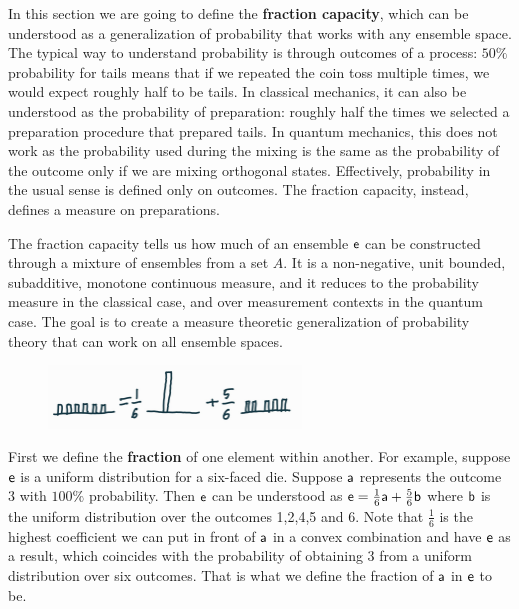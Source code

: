 In this section we are going to define the \textbf{fraction capacity}, which can be understood as a generalization of probability that works with any ensemble space. The typical way to understand probability is through outcomes of a process: $50\%$ probability for tails means that if we repeated the coin toss multiple times, we would expect roughly half to be tails. In classical mechanics, it can also be understood as the probability of preparation: roughly half the times we selected a preparation procedure that prepared tails. In quantum mechanics, this does not work as the probability used during the mixing is the same as the probability of the outcome only if we are mixing orthogonal states. Effectively, probability in the usual sense is defined only on outcomes. The fraction capacity, instead, defines a measure on preparations.

The fraction capacity tells us how much of an ensemble $\ens$ can be constructed through a mixture of ensembles from a set $A$. It is a non-negative, unit bounded, subadditive, monotone continuous measure, and it reduces to the probability measure in the classical case, and over measurement contexts in the quantum case. The goal is to create a measure theoretic generalization of probability theory that can work on all ensemble spaces.

\begin{figure}[h]
	\centering
	\includegraphics[width=0.6\textwidth]{tempimages/Fraction.jpg}
\end{figure}

First we define the \textbf{fraction} of one element within another. For example, suppose $\ens$ is a uniform distribution for a six-faced die. Suppose $\ens[a]$ represents the outcome 3 with $100\%$ probability. Then $\ens$ can be understood as $\ens = \frac{1}{6} \ens[a] + \frac{5}{6} \ens[b]$ where $\ens[b]$ is the uniform distribution over the outcomes 1,2,4,5 and 6. Note that $\frac{1}{6}$ is the highest coefficient we can put in front of $\ens[a]$ in a convex combination and have $\ens$ as a result, which coincides with the probability of obtaining 3 from a uniform distribution over six outcomes. That is what we define the fraction of $\ens[a]$ in $\ens$ to be.

